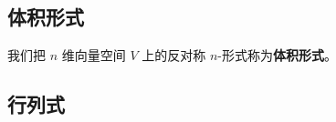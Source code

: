 
\begin{issues}
\issueDraft
\end{issues}


\subsection{体积形式}




我们把 $n$ 维向量空间 $V$ 上的反对称 $n$-形式称为\textbf{体积形式}。




\subsection{行列式}

